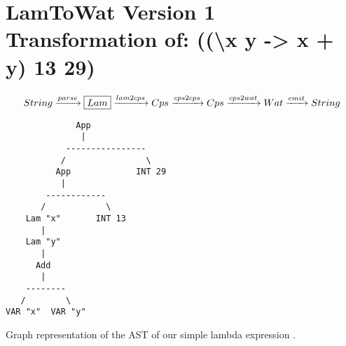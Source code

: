 \section{\label{section:v1printnest}LamToWat Version 1 Transformation of: ((\textbackslash x y -> x + y) 13 29)}

\begin{landscape}
\begin{gather*}
  String \xrightarrow{parse} \boxed{Lam} \xrightarrow{lam2cps} Cps \xrightarrow{cps2cps} Cps \xrightarrow{cps2wat} Wat \xrightarrow{emit} String
\end{gather*}

\begin{lstlisting}
              App
               |
            ----------------
           /                \
          App             INT 29
           |
        ------------
       /            \
    Lam "x"       INT 13
       |
    Lam "y"
       |
      Add
       |
    --------
   /        \
VAR "x"  VAR "y"

\end{lstlisting}
Graph representation of the AST of our simple lambda expression .
\end{landscape}
\clearpage

